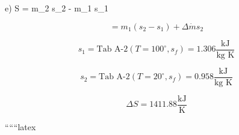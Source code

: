 e) \quad \Delta S = m_2 s_2 - m_1 s_1

\[
= m_1 (s_2 - s_1) + \Delta \dot{m} s_2
\]

\[
s_1 = \text{Tab A-2} \left( T = 100^\circ, s_f \right) = 1.306 \frac{\text{kJ}}{\text{kg K}}
\]

\[
s_2 = \text{Tab A-2} \left( T = 20^\circ, s_f \right) = 0.958 \frac{\text{kJ}}{\text{kg K}}
\]

\[
\Delta S = 1411.88 \frac{\text{kJ}}{\text{K}}
\]

``````latex